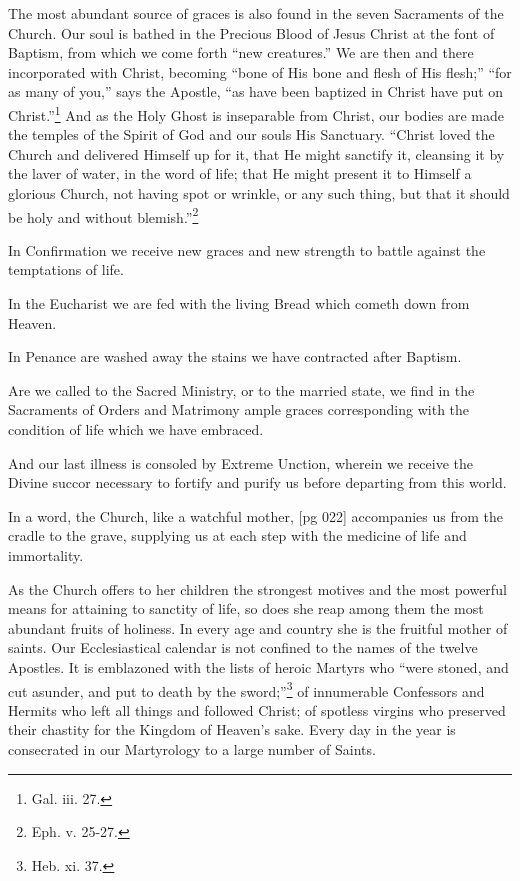 The most abundant source of graces is also
found in the seven Sacraments of the Church. Our
soul is bathed in the Precious Blood of Jesus
Christ at the font of Baptism, from which we come
forth “new creatures.” We are then and there
incorporated with Christ, becoming “bone of His
bone and flesh of His flesh;” “for as many of
you,” says the Apostle, “as have been baptized in
Christ have put on Christ.”\footnote{Gal.
iii. 27.} And as the Holy
Ghost is inseparable from Christ, our bodies are
made the temples of the Spirit of God and our
souls His Sanctuary. “Christ loved the Church
and delivered Himself up for it, that He might
sanctify it, cleansing it by the laver of water, in
the word of life; that He might present it to Himself
a glorious Church, not having spot or wrinkle,
or any such thing, but that it should be holy and
without blemish.”\footnote{Eph. v. 25-27.}

In Confirmation we receive new graces and new
strength to battle against the temptations of life.

In the Eucharist we are fed with the living
Bread which cometh down from Heaven.

In Penance are washed away the stains we have
contracted after Baptism.

Are we called to the Sacred Ministry, or to the
married state, we find in the Sacraments of Orders
and Matrimony ample graces corresponding with
the condition of life which we have embraced.

And our last illness is consoled by Extreme Unction,
wherein we receive the Divine succor necessary
to fortify and purify us before departing
from this world.

In a word, the Church, like a watchful mother,
[pg 022]
accompanies us from the cradle to the grave, supplying
us at each step with the medicine of life and
immortality.

As the Church offers to her children the strongest
motives and the most powerful means for attaining
to sanctity of life, so does she reap among
them the most abundant fruits of holiness. In
every age and country she is the fruitful mother of
saints. Our Ecclesiastical calendar is not confined
to the names of the twelve Apostles. It is emblazoned
with the lists of heroic Martyrs who
“were stoned, and cut asunder, and put to death
by the sword;”\footnote{Heb. xi.
37.} of innumerable Confessors and
Hermits who left all things and followed Christ; of
spotless virgins who preserved their chastity for
the Kingdom of Heaven's sake. Every day in the
year is consecrated in our Martyrology to a large
number of Saints.

